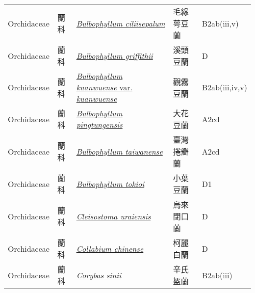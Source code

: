 {\begin{longtable}{p{2.5cm}p{2.5cm}p{4.5cm}p{2.5cm}p{3cm}}
    Orchidaceae & 蘭科 & \href{http://www.theplantlist.org/tpl1.1/search?q=Bulbophyllum+ciliisepalum}{\textit{Bulbophyllum ciliisepalum} } & 毛緣萼豆蘭 & B2ab(iii,v) \index{Bulbophyllum@\textit{Bulbophyllum}!ciliisepalum@\textit{ciliisepalum}}  \index{毛緣萼豆蘭} \\
    Orchidaceae & 蘭科 & \href{http://www.theplantlist.org/tpl1.1/search?q=Bulbophyllum+griffithii}{\textit{Bulbophyllum griffithii} } & 溪頭豆蘭 & D \index{Bulbophyllum@\textit{Bulbophyllum}!griffithii@\textit{griffithii}}  \index{溪頭豆蘭} \\
    Orchidaceae & 蘭科 & \href{http://www.theplantlist.org/tpl1.1/search?q=Bulbophyllum+kuanwuense+var.+kuanwuense}{\textit{Bulbophyllum kuanwuense} var. \textit{kuanwuense} } & 觀霧豆蘭 & B2ab(iii,iv,v) \index{Bulbophyllum@\textit{Bulbophyllum}!kuanwuense@\textit{kuanwuense}!var. kuanwuense@var. \textit{kuanwuense}}  \index{觀霧豆蘭} \\
    Orchidaceae & 蘭科 & \href{http://www.theplantlist.org/tpl1.1/search?q=Bulbophyllum+pingtungensis}{\textit{Bulbophyllum pingtungensis} } & 大花豆蘭 & A2cd \index{Bulbophyllum@\textit{Bulbophyllum}!pingtungensis@\textit{pingtungensis}}  \index{大花豆蘭} \\
    Orchidaceae & 蘭科 & \href{http://www.theplantlist.org/tpl1.1/search?q=Bulbophyllum+taiwanense}{\textit{Bulbophyllum taiwanense} } & 臺灣捲瓣蘭 & A2cd \index{Bulbophyllum@\textit{Bulbophyllum}!taiwanense@\textit{taiwanense}}  \index{臺灣捲瓣蘭} \\
    Orchidaceae & 蘭科 & \href{http://www.theplantlist.org/tpl1.1/search?q=Bulbophyllum+tokioi}{\textit{Bulbophyllum tokioi} } & 小葉豆蘭 & D1 \index{Bulbophyllum@\textit{Bulbophyllum}!tokioi@\textit{tokioi}}  \index{小葉豆蘭} \\
    Orchidaceae & 蘭科 & \href{http://www.theplantlist.org/tpl1.1/search?q=Cleisostoma+uraiensis}{\textit{Cleisostoma uraiensis} } & 烏來閉口蘭 & D \index{Cleisostoma@\textit{Cleisostoma}!uraiensis@\textit{uraiensis}}  \index{烏來閉口蘭} \\
    Orchidaceae & 蘭科 & \href{http://www.theplantlist.org/tpl1.1/search?q=Collabium+chinense}{\textit{Collabium chinense} } & 柯麗白蘭 & D \index{Collabium@\textit{Collabium}!chinense@\textit{chinense}}  \index{柯麗白蘭} \\
    Orchidaceae & 蘭科 & \href{http://www.theplantlist.org/tpl1.1/search?q=Corybas+sinii}{\textit{Corybas sinii} } & 辛氏盔蘭 & B2ab(iii) \index{Corybas@\textit{Corybas}!sinii@\textit{sinii}}  \index{辛氏盔蘭} \\

\end{longtable}}
